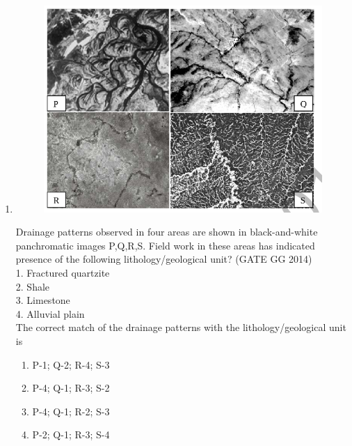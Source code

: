\documentclass[journal]{IEEEtran}
\begin{document}
\begin{enumerate}[start=1]
\item 
\begin{figure}[H]
    \centering
    \includegraphics[width=0.5\columnwidth]{figs/05.png} 
    \caption{}
    \label{fig:48}
\end{figure}
Drainage patterns observed in four areas are shown in black-and-white panchromatic images P,Q,R,S. Field work in these areas has indicated presence  of the following lithology/geological unit?  
\hfill(GATE GG 2014)\\
1. Fractured quartzite\\  
2. Shale\\
3. Limestone\\  
4. Alluvial plain\\  
The correct match of the drainage patterns with the lithology/geological unit is
\begin{enumerate}
    \item P-1; Q-2; R-4; S-3
    \item P-4; Q-1; R-3; S-2
    \item P-4; Q-1; R-2; S-3
    \item P-2; Q-1; R-3; S-4
\end{enumerate}



\end{enumerate}
\end{document}
